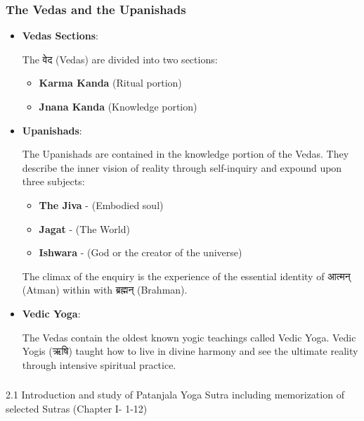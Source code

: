 \begin{frame}[fragile]\frametitle{The Vedas and the Upanishads}
      \begin{itemize}
        \item \textbf{Vedas Sections}: 
          
          The वेद (Vedas) are divided into two sections:
          \begin{itemize}
            \item \textbf{Karma Kanda} (Ritual portion)
            \item \textbf{Jnana Kanda} (Knowledge portion)
          \end{itemize}
          
        \item \textbf{Upanishads}: 
          
          The Upanishads are contained in the knowledge portion of the Vedas. They describe the inner vision of reality through self-inquiry and expound upon three subjects:
          \begin{itemize}
            \item \textbf{The Jiva} - (Embodied soul)
            \item \textbf{Jagat} - (The World)
            \item \textbf{Ishwara} - (God or the creator of the universe)
          \end{itemize}
          The climax of the enquiry is the experience of the essential identity of आत्मन् (Atman) within with ब्रह्मन् (Brahman).
          
        \item \textbf{Vedic Yoga}: 
          
          The Vedas contain the oldest known yogic teachings called Vedic Yoga. Vedic Yogis (ऋषि) taught how to live in divine harmony and see the ultimate reality through intensive spiritual practice.
          
      \end{itemize}
\end{frame}



\begin{frame}[fragile]\frametitle{}
\begin{center}
{\Large 2.1  Introduction  and  study  of  Patanjala  Yoga  Sutra  including  memorization  of  selected Sutras (Chapter I- 1-12)}
\end{center}
\end{frame}

